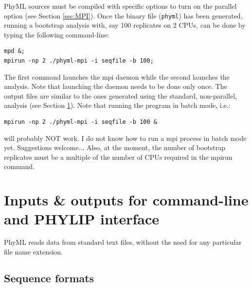 \documentclass[a4paper,12pt]{article}
\newcommand{\x}[1]{\texttt{#1}}
\begin{document}
PhyML sources  must be compiled with  specific options to turn  on the parallel  option (see Section
\ref{sec:MPI}). Once  the binary file (\x{phyml})  has been generated, running  a bootstrap analysis
with, say 100 replicates on 2 CPUs, can be done by typing the following command-line:
\begin{verbatim}
mpd &;
mpirun -np 2 ./phyml-mpi -i seqfile -b 100;
\end{verbatim}
The  first command  launches  the mpi  daemon  while the  second launches  the  analysis. Note  that
launching the daemon needs to be done only once.  The output files are similar to the ones generated
using the standard, non-parallel, analysis (see Section \ref{sec:input_output}). Note that running
the program in batch mode, i.e.:
\begin{verbatim}
mpirun -np 2 ./phyml-mpi -i seqfile -b 100 &
\end{verbatim}
will probably NOT work. I do not know how to run a mpi process in batch mode yet. Suggestions welcome...
Also, at the moment, the number of bootstrap replicates must be a multiple of the number of CPUs
required in the mpirun command.

\section{Inputs \& outputs for command-line and PHYLIP interface }\label{sec:input_output}

PhyML reads data from standard text files,  without the need for any particular file name extension.

\subsection{Sequence formats}
\end{document}

